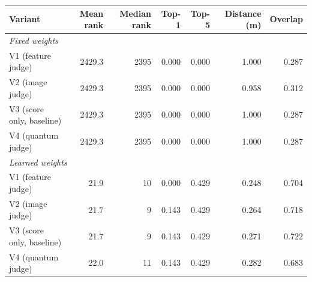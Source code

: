 \begin{tabular}{lrrrrrr}
\toprule
Variant & Mean rank & Median rank & Top-1 & Top-5 & Distance (m) & Overlap \\
\midrule
\multicolumn{7}{l}{\emph{Fixed weights}} \\
\quad V1 (feature judge) & 2429.3 & 2395 & 0.000 & 0.000 & 1.000 & 0.287 \\
\quad V2 (image judge) & 2429.3 & 2395 & 0.000 & 0.000 & 0.958 & 0.312 \\
\quad V3 (score only, baseline) & 2429.3 & 2395 & 0.000 & 0.000 & 1.000 & 0.287 \\
\quad V4 (quantum judge) & 2429.3 & 2395 & 0.000 & 0.000 & 1.000 & 0.287 \\
\midrule
\multicolumn{7}{l}{\emph{Learned weights}} \\
\quad V1 (feature judge) & 21.9 & 10 & 0.000 & 0.429 & 0.248 & 0.704 \\
\quad V2 (image judge) & 21.7 & 9 & 0.143 & 0.429 & 0.264 & 0.718 \\
\quad V3 (score only, baseline) & 21.7 & 9 & 0.143 & 0.429 & 0.271 & 0.722 \\
\quad V4 (quantum judge) & 22.0 & 11 & 0.143 & 0.429 & 0.282 & 0.683 \\
\bottomrule
\end{tabular}